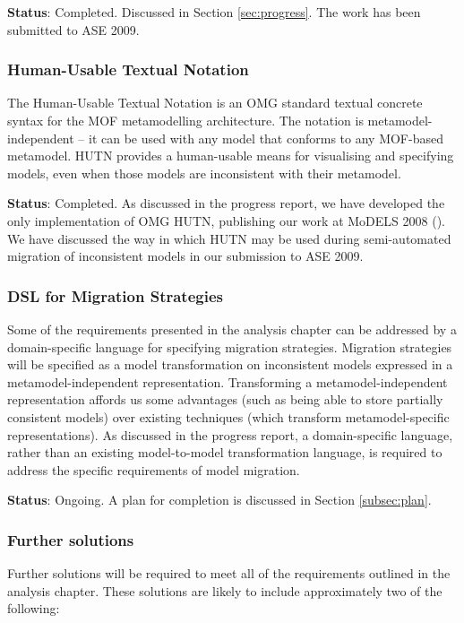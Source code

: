 \textbf{Status}: Completed. Discussed in Section \ref{sec:progress}. The work has been submitted to ASE 2009.


\subsubsection{Human-Usable Textual Notation}
The Human-Usable Textual Notation is an OMG standard textual concrete syntax for the MOF metamodelling architecture. The notation is metamodel-independent -- it can be used with any model that conforms to any MOF-based metamodel. HUTN provides a human-usable means for visualising and specifying models, even when those models are inconsistent with their metamodel.

\textbf{Status}: Completed. As discussed in the progress report, we have developed the only implementation of OMG HUTN, publishing our work at MoDELS 2008 (\cite{rose08hutn}). We have discussed the way in which HUTN may be used during semi-automated migration of inconsistent models in our submission to ASE 2009.


\subsubsection{DSL for Migration Strategies}
Some of the requirements presented in the analysis chapter can be addressed by a domain-specific language for specifying migration strategies. Migration strategies will be specified as a model transformation on inconsistent models expressed in a metamodel-independent representation. Transforming a metamodel-independent representation affords us some advantages (such as being able to store partially consistent models) over existing techniques (which transform metamodel-specific representations). As discussed in the progress report, a domain-specific language, rather than an existing model-to-model transformation language, is required to address the specific requirements of model migration.

\textbf{Status}: Ongoing. A plan for completion is discussed in Section \ref{subsec:plan}.


\subsubsection{Further solutions}
\label{subsubsec:further_solutions}
Further solutions will be required to meet all of the requirements outlined in the analysis chapter. These solutions are likely to include approximately two of the following:

